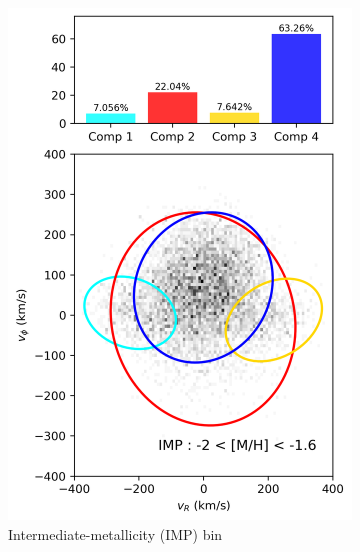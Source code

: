 \documentclass[a4paper,10pt]{article}
\begin{document}
\begin{multicols}{2}
\begin{figure}[H]
\begin{subfigure}[t]{0.48\linewidth}
    \includegraphics[width=\linewidth]{../figures/gmm_IMP.png}
    \caption{Intermediate-metallicity (IMP) bin}
    \label{fig:gmm_imp}
  \end{subfigure}
  \\[0.5em]
  \begin{subfigure}[t]{0.48\linewidth}

\end{subfigure}
\end{figure}
\end{multicols}
\end{document}
